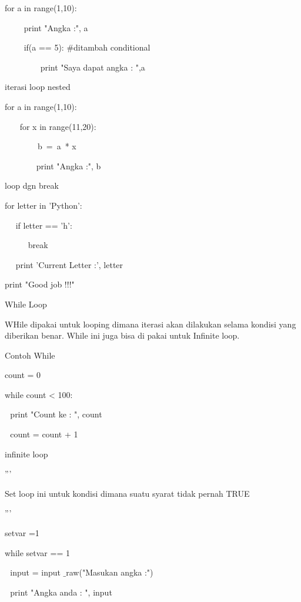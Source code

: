 for a in range(1,10): \par
~~~~ print "Angka :", a \par
~~~~ if(a == 5):  $  \#  $ditambah conditional \par
~~~~~~~~ print "Saya dapat angka : ",a \par
\vspace{12pt}
iterasi loop nested \par
for a in range(1,10): \par
~~~ for x in range(11,20): \par
~~~~~~~~b~=~a~* x      \par
~~~~~~~ print "Angka :", b \par
\vspace{12pt}
loop dgn break \par
for letter in 'Python': \par
~~ if letter == 'h': \par
~~~~~ break \par
~~ print 'Current Letter :', letter \par
\vspace{12pt}
print "Good job !!!" \par
\vspace{12pt}
While Loop \par
WHile dipakai untuk looping dimana iterasi akan dilakukan selama kondisi yang diberikan benar. While ini juga bisa di pakai untuk Infinite loop. \par
\vspace{12pt}
Contoh While \par
count = 0 \par
while count < 100: \par
 $  $  $  $  $  $print "Count ke : ", count \par
 $  $  $  $  $  $count = count + 1 \par
\vspace{12pt}
infinite loop \par
''' \par
Set loop ini untuk kondisi dimana suatu syarat tidak pernah TRUE \par
''' \par
\vspace{12pt}
setvar =1 \par
while setvar == 1 \par
 $  $  $  $ input = input $  \_  $raw("Masukan angka :") \par
 $  $  $  $ print "Angka anda : ", input \par
\vspace{12pt}

